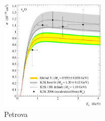 \documentclass[review]{elsarticle}
\begin{document}
\begin{figure}[h!]
\begin{center}
\includegraphics[width=0.45\textwidth]{./QES/sQESCC_K2K06_101.3.00.301.00_2_BBBA25_SM.eps}
\caption{Petrova}
\label{K2K}
\end{center}
\end{figure}
\end{document}
